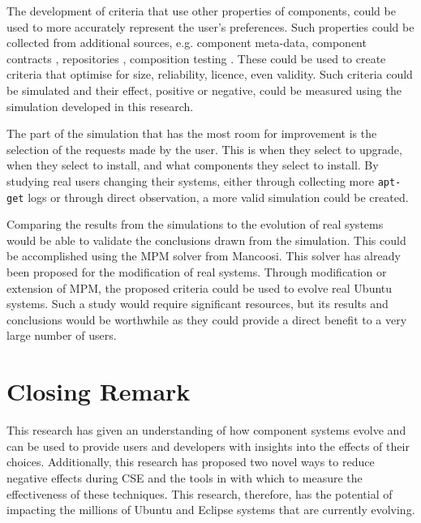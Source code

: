 The development of criteria that use other properties of components, 
could be used to more accurately represent the user's preferences.
Such properties could be collected from additional sources, 
e.g. component meta-data, component contracts \citep{Watkins1999}, repositories \citep{Guo2000}, 
composition testing \citep{XuejieZhang2008}.
These could be used to create criteria that optimise for size, reliability, licence, even validity.
Such criteria could be simulated and their effect, positive or negative, 
could be measured using the simulation developed in this research.

The part of the simulation that has the most room for improvement is the selection of the requests made by the user.
This is when they select to upgrade, when they select to install, and what components they select to install.
By studying real users changing their systems, either through collecting more \texttt{apt-get} logs or through direct observation,
a more valid simulation could be created.

Comparing the results from the simulations to the evolution of real systems would be able to validate the conclusions drawn from the simulation.
This could be accomplished using the MPM solver \citep{abate2011} from Mancoosi.
This solver has already been proposed for the modification of real systems.
Through modification or extension of MPM, the proposed criteria could be used to evolve real Ubuntu systems.
Such a study would require significant resources, but its results and conclusions would be worthwhile as they could provide a direct benefit to a very large number of users.

\section{Closing Remark}
This research has given an understanding of how component systems evolve and can be used to provide users and developers with insights into the effects of their choices.
Additionally, this research has proposed two novel ways to reduce negative effects during CSE and the tools in with which to measure the effectiveness of these techniques.
This research, therefore, has the potential of impacting the millions of Ubuntu and Eclipse systems that are currently evolving.

